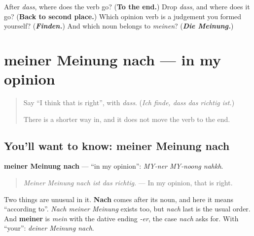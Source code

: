 \begin{tcolorbox}[breakable,colback=teal!4,colframe=teal!35!black,title={Before you move on}]
After \emph{dass}, where does the verb go? (\textbf{To the end.}) Drop \emph{dass}, and where does it go? (\textbf{Back to second place.}) Which opinion verb is a judgement you formed yourself? (\emph{\textbf{Finden.}}) And which noun belongs to \emph{meinen}? (\emph{\textbf{Die Meinung.}})
\end{tcolorbox}
\section[meiner Meinung nach]{meiner Meinung nach — in my opinion}

\label{lesson:GE-C254-meiner-meinung-nach}



\begin{quote}
Say \textquotedblleft{}I think that is right\textquotedblright{}, with \emph{dass}. (\emph{Ich finde, dass das richtig ist.})

There is a shorter way in, and it does not move the verb to the end.
\end{quote}

\subsection*{You'll want to know: meiner Meinung nach}
\textbf{meiner Meinung nach} — \textquotedblleft{}in my opinion\textquotedblright{}: \emph{MY-ner MY-noong nahkh}.

\begin{quote}
\emph{Meiner Meinung nach ist das richtig.} — In my opinion, that is right.
\end{quote}

Two things are unusual in it. \textbf{Nach} comes after its noun, and here it means \textquotedblleft{}according to\textquotedblright{}. \emph{Nach meiner Meinung} exists too, but \emph{nach} last is the usual order. And \textbf{meiner} is \emph{mein} with the dative ending \emph{-er}, the case \emph{nach} asks for. With \textquotedblleft{}your\textquotedblright{}: \emph{deiner Meinung nach}.

